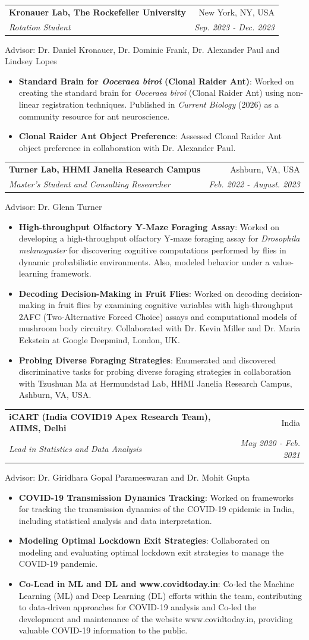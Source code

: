 \documentclass[letterpaper,9pt]{article}
\makeatletter
\newcommand{\resumeItem}[2]{
  \item\small{
    \textbf{#1}{: #2 \vspace{-2pt}}
  }
}
\newcommand{\resumeSubheadingWithText}[5]{
  \vspace{-1pt}\item
    \begin{tabular*}{0.97\textwidth}[t]{l@{\extracolsep{\fill}}r}
      \textbf{#1} & #2 \\
      \textit{\small#3} & \textit{\small #4}
    \end{tabular*}\vspace{2pt}
}
\newcommand{\resumeItemListStart}{\begin{itemize}}
\newcommand{\resumeItemListEnd}{\end{itemize}\vspace{-5pt}}
\makeatother
\begin{document}
    \resumeSubheadingWithText
      {Kronauer Lab, The Rockefeller University}{New York, NY, USA}
      {Rotation Student}{Sep. 2023 - Dec. 2023}
      \small{Advisor: Dr. Daniel Kronauer, Dr. Dominic Frank, Dr. Alexander Paul and Lindsey Lopes}
      \resumeItemListStart
        \resumeItem{Standard Brain for \textit{Ooceraea biroi} (Clonal Raider Ant)}
          {Worked on creating the standard brain for \textit{Ooceraea biroi} (Clonal Raider Ant) using non-linear registration techniques. Published in \textit{Current Biology} (2026) as a community resource for ant neuroscience.}
        \resumeItem{Clonal Raider Ant Object Preference}
          {Assessed Clonal Raider Ant object preference in collaboration with Dr. Alexander Paul.}
      \resumeItemListEnd

      \resumeSubheadingWithText
      {Turner Lab, HHMI Janelia Research Campus}{Ashburn, VA, USA}
      {Master’s Student and Consulting Researcher}{Feb. 2022 - August. 2023}
      \small{Advisor: Dr. Glenn Turner}
      \resumeItemListStart
        \resumeItem{High-throughput Olfactory Y-Maze Foraging Assay}
          {Worked on developing a high-throughput olfactory Y-maze foraging assay for \textit{Drosophila melanogaster} for discovering cognitive computations performed by flies in dynamic probabilistic environments. Also, modeled behavior under a value-learning framework.}
        \resumeItem{Decoding Decision-Making in Fruit Flies}
          {Worked on decoding decision-making in fruit flies by examining cognitive variables with high-throughput 2AFC (Two-Alternative Forced Choice) assays and computational models of mushroom body circuitry. Collaborated with Dr. Kevin Miller and Dr. Maria Eckstein at Google Deepmind, London, UK.}
        \resumeItem{Probing Diverse Foraging Strategies}
          {Enumerated and discovered discriminative tasks for probing diverse foraging strategies in collaboration with Tzushuan Ma at Hermundstad Lab, HHMI Janelia Research Campus, Ashburn, VA, USA.}
      \resumeItemListEnd

      \resumeSubheadingWithText
      {iCART (India COVID19 Apex Research Team), AIIMS, Delhi}{India}
      {Lead in Statistics and Data Analysis}{May 2020 - Feb. 2021}
      \small{Advisor: Dr. Giridhara Gopal Parameswaran and Dr. Mohit Gupta}
      \resumeItemListStart
        \resumeItem{COVID-19 Transmission Dynamics Tracking}
          {Worked on frameworks for tracking the transmission dynamics of the COVID-19 epidemic in India, including statistical analysis and data interpretation.}
        \resumeItem{Modeling Optimal Lockdown Exit Strategies}
          {Collaborated on modeling and evaluating optimal lockdown exit strategies to manage the COVID-19 pandemic.}
        \resumeItem{Co-Lead in ML and DL and www.covidtoday.in}
          {Co-led the Machine Learning (ML) and Deep Learning (DL) efforts within the team, contributing to data-driven approaches for COVID-19 analysis and Co-led the development and maintenance of the website www.covidtoday.in, providing valuable COVID-19 information to the public.}
      \resumeItemListEnd
\end{document}
